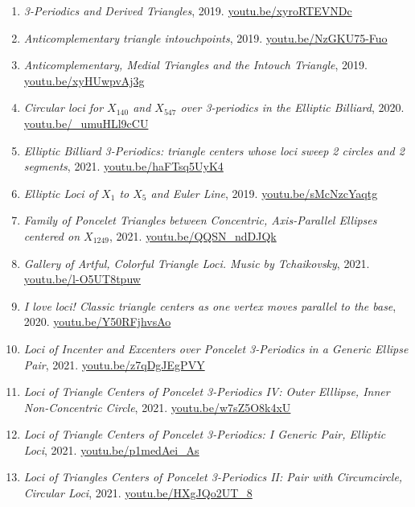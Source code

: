 \documentclass[12pt]{article}
\begin{document}
\begin{enumerate}[resume]
\item \textit{3-Periodics and Derived Triangles}, 2019. \href{https://youtu.be/xyroRTEVNDc}{\url{youtu.be/xyroRTEVNDc}}
\item \textit{Anticomplementary triangle intouchpoints}, 2019. \href{https://youtu.be/NzGKU75-Fuo}{\url{youtu.be/NzGKU75-Fuo}}
\item \textit{Anticomplementary, Medial Triangles and the Intouch Triangle}, 2019. \href{https://youtu.be/xyHUwpvAj3g}{\url{youtu.be/xyHUwpvAj3g}}
\item \textit{Circular loci for $X_{140}$ and $X_{547}$ over 3-periodics in the Elliptic Billiard}, 2020. \href{https://youtu.be/_umuHLl9cCU}{\url{youtu.be/\_umuHLl9cCU}}
\item \textit{Elliptic Billiard 3-Periodics: triangle centers whose loci sweep 2 circles and 2 segments}, 2021. \href{https://youtu.be/haFTsq5UyK4}{\url{youtu.be/haFTsq5UyK4}}
\item \textit{Elliptic Loci of $X_{1}$ to $X_{5}$ and Euler Line}, 2019. \href{https://youtu.be/sMcNzcYaqtg}{\url{youtu.be/sMcNzcYaqtg}}
\item \textit{Family of Poncelet Triangles between Concentric, Axis-Parallel Ellipses centered on $X_{1249}$}, 2021. \href{https://youtu.be/QQSN_ndDJQk}{\url{youtu.be/QQSN\_ndDJQk}}
\item \textit{Gallery of Artful, Colorful Triangle Loci. Music by Tchaikovsky}, 2021. \href{https://youtu.be/l-O5UT8tpuw}{\url{youtu.be/l-O5UT8tpuw}}
\item \textit{I love loci! Classic triangle centers as one vertex moves parallel to the base}, 2020. \href{https://youtu.be/Y50RFjhvsAo}{\url{youtu.be/Y50RFjhvsAo}}
\item \textit{Loci of Incenter and Excenters over Poncelet 3-Periodics in a Generic Ellipse Pair}, 2021. \href{https://youtu.be/z7qDgJEgPVY}{\url{youtu.be/z7qDgJEgPVY}}
\item \textit{Loci of Triangle Centers of Poncelet 3-Periodics IV: Outer Elllipse, Inner Non-Concentric Circle}, 2021. \href{https://youtu.be/w7sZ5O8k4xU}{\url{youtu.be/w7sZ5O8k4xU}}
\item \textit{Loci of Triangle Centers of Poncelet 3-Periodics: 
I Generic Pair, Elliptic Loci}, 2021. \href{https://youtu.be/p1medAei_As}{\url{youtu.be/p1medAei\_As}}
\item \textit{Loci of Triangles Centers of Poncelet 3-Periodics II: Pair with Circumcircle, Circular Loci}, 2021. \href{https://youtu.be/HXgJQo2UT_8}{\url{youtu.be/HXgJQo2UT\_8}}

\end{enumerate}
\end{document}
